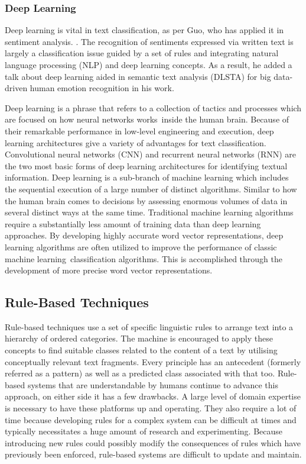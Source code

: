 \documentclass[a4paper]{article}
\begin{document}
\subsubsection{Deep Learning}
Deep learning is vital in text classification, as per Guo, who has applied it in sentiment analysis. \cite{ES8}. The recognition of sentiments expressed via written text is largely a classification issue guided by a set of rules and integrating natural language processing (NLP) and deep learning concepts. As a result, he added a talk about deep learning aided in semantic text analysis (DLSTA) for big data-driven human emotion recognition in his work.

Deep learning is a phrase that refers to a collection of tactics and processes which are focused on how neural networks works inside the human brain. Because of their remarkable performance in low-level engineering and execution, deep learning architectures give a variety of advantages for text classification. Convolutional neural networks (CNN) and recurrent neural networks (RNN) are the two most basic forms of deep learning architectures for identifying textual information. Deep learning is a sub-branch of machine learning which includes the sequential execution of a large number of distinct algorithms. Similar to how the human brain comes to decisions by assessing enormous volumes of data in several distinct ways at the same time. Traditional machine learning algorithms require a substantially less amount of training data than deep learning approaches. By developing highly accurate word vector representations, deep learning algorithms are often utilized to improve the performance of classic machine learning classification algorithms. This is accomplished through the development of more precise word vector representations.


\subsection{Rule-Based Techniques}
Rule-based techniques use a set of specific linguistic rules to arrange text into a hierarchy of ordered categories. The machine is encouraged to apply these concepts to find suitable classes related to the content of a text by utilising conceptually relevant text fragments. Every principle has an antecedent (formerly referred as a pattern) as well as a predicted class associated with that too. Rule-based systems that are understandable by humans continue to advance this approach, on either side it has a few drawbacks. A large level of domain expertise is necessary to have these platforms up and operating. They also require a lot of time because developing rules for a complex system can be difficult at times and typically necessitates a huge amount of research and experimenting. Because introducing new rules could possibly modify the consequences of rules which have previously been enforced, rule-based systems are difficult to update and maintain.
\end{document}
